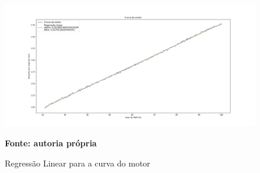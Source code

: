 \begin{figure}[!ht]
\centering
\caption{Regressão Linear para a curva do motor}
\label{fig:acionamento3}
		\centering
		\includegraphics[trim={5cm 1cm 5cm 2cm},clip,
scale=0.38]{Figuras/Curva_Do_Motor_rps}
	
	\textbf{Fonte: autoria própria}
\end{figure}